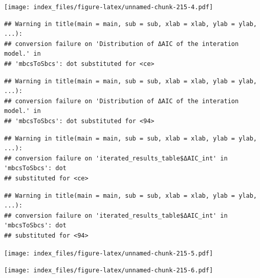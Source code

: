 \documentclass[
]{article}
\newenvironment{Shaded}{\begin{snugshade}}{\end{snugshade}}
\newcommand{\AttributeTok}[1]{\textcolor[rgb]{0.77,0.63,0.00}{#1}}
\newcommand{\FunctionTok}[1]{\textcolor[rgb]{0.00,0.00,0.00}{#1}}
\newcommand{\NormalTok}[1]{#1}
\newcommand{\SpecialCharTok}[1]{\textcolor[rgb]{0.00,0.00,0.00}{#1}}
\newcommand{\StringTok}[1]{\textcolor[rgb]{0.31,0.60,0.02}{#1}}
\begin{document}
\texttt{[image: index\_files/figure-latex/unnamed-chunk-215-4.pdf]}

\begin{Shaded}
\end{Shaded}

\begin{verbatim}
## Warning in title(main = main, sub = sub, xlab = xlab, ylab = ylab, ...):
## conversion failure on 'Distribution of ΔAIC of the interation model.' in
## 'mbcsToSbcs': dot substituted for <ce>
\end{verbatim}

\begin{verbatim}
## Warning in title(main = main, sub = sub, xlab = xlab, ylab = ylab, ...):
## conversion failure on 'Distribution of ΔAIC of the interation model.' in
## 'mbcsToSbcs': dot substituted for <94>
\end{verbatim}

\begin{verbatim}
## Warning in title(main = main, sub = sub, xlab = xlab, ylab = ylab, ...):
## conversion failure on 'iterated_results_table$ΔAIC_int' in 'mbcsToSbcs': dot
## substituted for <ce>
\end{verbatim}

\begin{verbatim}
## Warning in title(main = main, sub = sub, xlab = xlab, ylab = ylab, ...):
## conversion failure on 'iterated_results_table$ΔAIC_int' in 'mbcsToSbcs': dot
## substituted for <94>
\end{verbatim}

\texttt{[image: index\_files/figure-latex/unnamed-chunk-215-5.pdf]}

\begin{Shaded}
\end{Shaded}

\texttt{[image: index\_files/figure-latex/unnamed-chunk-215-6.pdf]}
\end{document}

